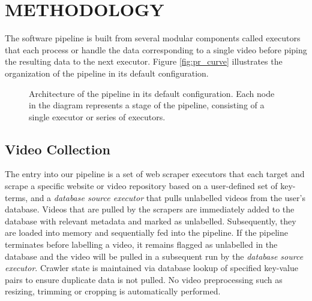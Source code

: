 \documentclass[letterpaper, 10 pt, conference]{ieeeconf}
\begin{document}
\section{METHODOLOGY}

The software pipeline is built from several modular components called executors that each process or handle the data corresponding to a single video before piping the resulting data to the next executor. Figure \ref{fig:pr_curve} illustrates the organization of the pipeline in its default configuration.

\begin{figure}[htpb]
	\centering
		\caption{Architecture of the pipeline in its default configuration. Each node in the diagram represents a stage of the pipeline, consisting of a single executor or series of executors.}
		\label{fig:pipeline-architecture}
\end{figure}

\subsection{Video Collection}

The entry into our pipeline is a set of web scraper executors that each target and scrape a specific website or video repository based on a user-defined set of key-terms, and a \textit{database source executor} that pulls unlabelled videos from the user's database. Videos that are pulled by the scrapers are immediately added to the database with relevant metadata and marked as unlabelled. Subsequently, they are loaded into memory and sequentially fed into the pipeline. If the pipeline terminates before labelling a video, it remains flagged as unlabelled in the database and the video will be pulled in a subsequent run by the \textit{database source executor}. Crawler state is maintained via database lookup of specified key-value pairs to ensure duplicate data is not pulled. No video preprocessing such as resizing, trimming or cropping is automatically performed.
\end{document}
